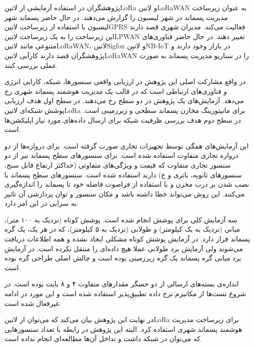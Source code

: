 

پژوهشگران در  استفاده آزمایشی از ‌لاتین{LoRa} و ‌لاتین{LoRaWAN} به عنوان زیرساخت مدیریت پسماند در شهر لیسبون را گزارش می‌دهند.
در حال حاضر پسماند شهر لیسبون با استفاده از زیرساخت ‌لاتین{GPRS} فعالیت می‌کند. مدیران شهری قصد دارند این زیرساخت را به یک زیرساخت ‌لاتین{LPWAN} تغییر دهند.
در حال حاضر فناوری‌های متنوعی مانند ‌لاتین{LoRaWAN}، ‌لاتین{Sigfox} و ‌لاتین{NB-IoT} در بازار وجود دارند و پژوهشگران قصد دارند کارآیی ‌لاتین{LoRaWAN} را در
سناریو مدیریت پسماند به صورت عملی بررسی کنند.

در واقع مشارکت اصلی این پژوهش در ارزیابی واقعی سنسورها، شبکه، کارایی انرژی و فناوری‌های ارتباطی است که در قالب یک مدیریت هوشمند پسماند شهری رخ می‌دهد.
آزمایش‌های یک پژوهش در دو سطح رخ می‌دهند. در سطح اول هدف ارزیابی پوشش شبکه‌ای ‌لاتین{LoRa} برای مانیتورینگ مخازن پسماند سطحی و زیرزمینی است.
در سطح دوم هدف بررسی ظرفیت شبکه برای ارسال داده‌های مورد نیاز اپلیکشن‌ها است.

این آزمایش‌های همگی توسط تجهیزات تجاری صورت گرفته است. برای دروازه‌ها از دو دروازه تجاری متفاوت استفاده شده است.
برای سنسورهای سطح پسماند نیز از دو سنسور تجاری متفاوت که قیمت و ویژگی‌های متفاوتی (حداکثر ارتفاع قابل سنج، سنسورهای ثانویه، باتری و ‌خ) دارند استفاده شده است.
سنسورهای سطح پسماند با نصب شدن بر درب مخزن و با استفاده از فراصوت فاصله خود تا پسماند را اندازه‌گیری می‌کنند. این روش می‌تواند خطا داشته باشد
و مکان سنسور و توان پردازشی آن تاثیر به سزایی در این امر دارد.

سه آزمایش کلی برای پوشش انجام شده است. پوشش کوتاه (نزدیک به ۱۰۰ متر)، میانی (نزدیک به یک کیلومتر) و طولانی (نزدیک به ۵ کیلومتر)، که در هر یک، یک گره پسماند قرار دارد.
در آزمایش پوشش کوتاه مشکلی ایجاد نشده و همه اطلاعات دریافت می‌شوند ولی آزمایش برد طولانی عملا هیچ داده‌ای را منتقل نکرده است.
در آزمایش برد میانی گره پسماند یک گره زیرزمینی بوده است و چالش اصلی طراحی گره بوده است.

اندازه‌ی بسته‌های ارسالی از دو حسگر مقدارهای متفاوت ۴ و ۸ بایت بوده است. در شروع تست‌ها از مکانیزم نرخ داده تطبیق‌پذیر استفاده شده است و این مورد در ادامه غیرفعال شده است.

در نهایت این پژوهش بیان می‌کند که می‌توان از ‌لاتین{LoRa} برای زیرساخت مدیریت هوشمند پسماند شهری استفاده کرد.
البته این پژوهش در رابطه با تعداد سنسورهایی که می‌توان در شبکه داشت و تداخل آن‌ها مطالعه‌ای انجام نداده است.


